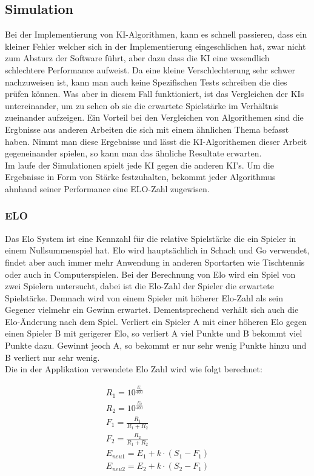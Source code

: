 \documentclass[12pt,a4paper,bibliography=totocnumbered,listof=totocnumbered]{article}
\begin{document}
\subsection{Simulation}
Bei der Implementierung von KI-Algorithmen, kann es schnell passieren, dass ein kleiner Fehler welcher sich in der Implementierung eingeschlichen hat, 
zwar nicht zum Absturz der Software führt, aber dazu dass die KI eine wesendlich schlechtere Performance aufweist. Da eine kleine Verschlechterung 
sehr schwer nachzuweisen ist, kann man auch keine Spezifischen Tests schreiben die dies prüfen können. Was aber in diesem Fall funktioniert, 
ist das Vergleichen der KIs untereinander, um zu sehen ob sie die erwartete Spielstärke im Verhältnis zueinander aufzeigen.
Ein Vorteil bei den Vergleichen von Algorithemen sind die Ergbnisse aus anderen Arbeiten die sich mit einem ähnlichen Thema befasst haben.
Nimmt man diese Ergebnisse und lässt die KI-Algorithemen dieser Arbeit gegeneinander spielen, so kann man das ähnliche Resultate erwarten.
\\
Im laufe der Simulationen spielt jede KI gegen die anderen KI's. Um die Ergebnisse in Form von Stärke festzuhalten, bekommt jeder Algorithmus ahnhand
seiner Performance eine ELO-Zahl zugewisen.

\subsubsection{ELO}
Das Elo System ist eine Kennzahl für die relative Spielstärke die ein Spieler in einem Nullsummenspiel hat. Elo wird hauptsächlich in Schach und Go verwendet,
findet aber auch immer mehr Anwendung in anderen Sportarten wie Tischtennis oder auch in Computerspielen. Bei der Berechnung von Elo wird ein Spiel von zwei 
Spielern untersucht, dabei ist die Elo-Zahl der Spieler die erwartete Spielstärke. Demnach wird von einem Spieler mit höherer Elo-Zahl als sein Gegener
vielmehr ein Gewinn erwartet. Dementsprechend verhält sich auch die Elo-Änderung nach dem Spiel. Verliert ein Spieler A mit einer höheren Elo gegen einen
Spieler B mit gerigerer Elo, so verliert A viel Punkte und B bekommt viel Punkte dazu. Gewinnt jeoch A, so bekommt er nur sehr wenig Punkte hinzu und B verliert 
nur sehr wenig. 
\\ 
Die in der Applikation verwendete Elo Zahl wird wie folgt berechnet:

\begin{align}
    R_1 = 10^{\frac{E_1}{400}} \\ 
    R_2 = 10^{\frac{E_2}{400}} \\
    F_1 = \frac{R_1}{R_1+R_2} \\ 
    F_2 = \frac{R_2}{R_1+R_2} \\
    E_{neu1} = E_1 + k \cdot (S_1 - F_1) \\ 
    E_{neu2} = E_2 + k \cdot (S_2 - F_1)  
\end{align}
\end{document}
